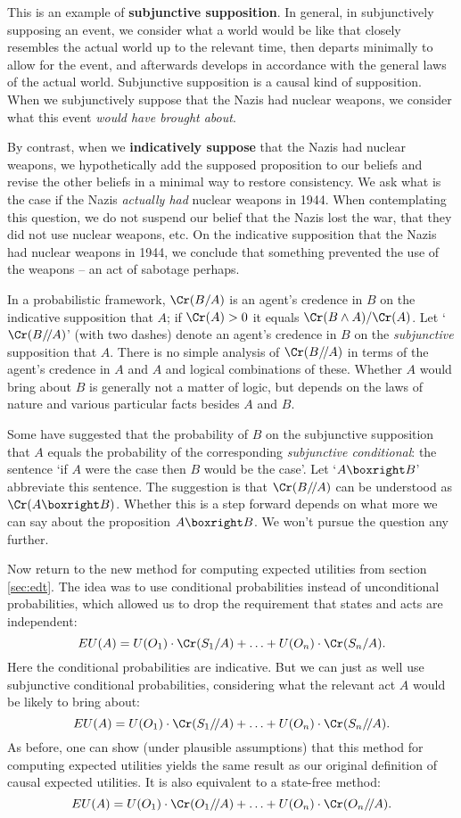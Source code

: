 This is an example of \textbf{subjunctive supposition}. In general,
in subjunctively supposing an event, we consider what a world would
be like that closely resembles the actual world up to the relevant
time, then departs minimally to allow for the event, and afterwards
develops in accordance with the general laws of the actual world.
Subjunctive supposition is a causal kind of supposition. When
we subjunctively suppose that the Nazis had nuclear weapons, we
consider what this event \emph{would have brought about}.

By contrast, when we \textbf{indicatively suppose} that the Nazis had nuclear
weapons, we hypothetically add the supposed proposition to our beliefs and
revise the other beliefs in a minimal way to restore consistency. We ask what is
the case if the Nazis \emph{actually had} nuclear weapons in 1944. When
contemplating this question, we do not suspend our belief that the Nazis lost
the war, that they did not use nuclear weapons, etc. On the indicative
supposition that the Nazis had nuclear weapons in 1944, we conclude that
something prevented the use of the weapons -- an act of sabotage perhaps.

In a probabilistic framework, $\Cr(B/A)$ is an agent's credence in $B$ on the
indicative supposition that $A$; if $\Cr(A)>0$ it equals
$\Cr(B \land A)/\Cr(A)$. Let `$\Cr(B/\!/A)$' (with two dashes) denote an agent's
credence in $B$ on the \emph{subjunctive} supposition that $A$. There is no
simple analysis of $\Cr(B/\!/A)$ in terms of the agent's credence in $A$ and $A$
and logical combinations of these. Whether $A$ would bring about $B$ is
generally not a matter of logic, but depends on the laws of nature and various
particular facts besides $A$ and $B$.

Some have suggested that the probability of $B$ on the subjunctive supposition
that $A$ equals the probability of the corresponding \emph{subjunctive
  conditional}: the sentence `if $A$ were the case then $B$ would be the case'.
Let `$A \boxright B$' abbreviate this sentence. The suggestion is that
$\Cr(B/\!/A)$ can be understood as $\Cr(A \boxright B)$. Whether this is a step
forward depends on what more we can say about the proposition $A \boxright B$.
We won't pursue the question any further.

Now return to the new method for computing expected utilities from
section \ref{sec:edt}. The idea was to use conditional probabilities
instead of unconditional probabilities, which allowed us to drop the
requirement that states and acts are independent:
\[
EU(A) = U(O_1) \cdot \Cr(S_1/A) + \ldots + U(O_n) \cdot \Cr(S_n/A).
\]
Here the conditional probabilities are indicative. But we can just
as well use subjunctive conditional probabilities, considering what
the relevant act $A$ would be likely to bring about:
\[
EU(A) = U(O_1) \cdot \Cr(S_1/\!/A) + \ldots + U(O_n) \cdot \Cr(S_n/\!/A).
\]
As before, one can show (under plausible assumptions) that this method
for computing expected utilities yields the same result as our
original definition of causal expected utilities. It is also
equivalent to a state-free method:
\[
EU(A) = U(O_1) \cdot \Cr(O_1/\!/A) + \ldots + U(O_n) \cdot \Cr(O_n/\!/A).
\]


